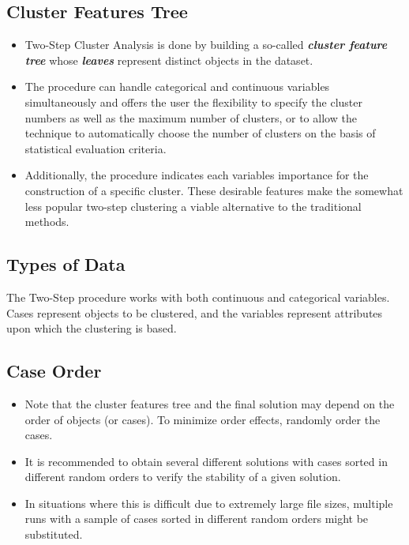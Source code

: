 \documentclass[a4paper,12pt]{article}
\begin{document}
\subsection{Cluster Features Tree}

\begin{itemize}
	\item Two-Step Cluster Analysis is done by building a so-called \textbf{\textit{cluster feature tree}} whose \textbf{\textit{leaves}} represent distinct objects in the dataset. 
	\item The procedure can handle categorical and continuous variables simultaneously and offers the user the flexibility to specify the cluster numbers as well as the maximum number of clusters, or to allow the technique to automatically choose the number of clusters on the basis of statistical evaluation criteria.
	
	\item Additionally, the procedure indicates each variables importance for the construction of a specific cluster. These desirable features make the somewhat less popular two-step clustering a viable alternative to the traditional
	methods.
	
	
\end{itemize}


\subsection{Types of Data} The Two-Step procedure works with both continuous and categorical variables. Cases represent objects to be clustered, and the variables represent attributes upon which the clustering is based.



\subsection{Case Order}
\begin{itemize}
    \item Note that the cluster features tree and the final solution may depend on the order of objects (or cases). To minimize order effects, randomly order the cases. 
    \item It is recommended to obtain several different solutions with cases sorted in different random orders to verify the stability of a given solution. 
    \item In situations where this is difficult due to extremely large file sizes, multiple runs with a sample of cases sorted in different random orders might be substituted.
\end{itemize}
\end{document}
